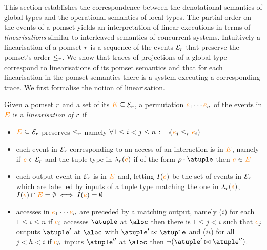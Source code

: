 This section establishes the correspondence between the denotational
semantics of global types and the operational semantics of local
types.
%
The partial order on the events of a pomset yields an interpretation
of linear executions in terms of \emph{linearisations} similar to
interleaved semantics of concurrent systems.
%
Intuitively a linearisation of a pomset $r$ is a sequence of the
events $\mathcal{E}_{r}$ that preserve the pomset's order
$\leq_{r}$.
%
We show that traces of projections of a global type correspond to
linearisations of its pomset semantics and that for each linearisation
in the pomset semantics there is a system executing a corresponding
trace.
%
We first formalise the notion of linearisation.

Given a pomset $r$ and a set of its ${\color{orange}{E}} \subseteq \mathcal{E}_{r}$,
a permutation ${\color{orange}{e}}_1 \cdots {\color{orange}{e}}_n$ of the events in ${\color{orange}{E}}$ is a
\emph{linearisation of $r$} if
\begin{itemize}
\item ${\color{orange}{E}} \subseteq \mathcal{E}_{r}$ preserves $\leq_{r}$ namely
  $\forall 1 \leq i < j \leq n \;\colon\; \neg ({\color{orange}{e}}_j \leq_{r} {\color{orange}{e}}_i)$
\item each event in $\mathcal{E}_{r}$ corresponding to an access of an
  interaction is in ${\color{orange}{E}}$, namely
  if ${\color{orange}{e}} \in \mathcal{E}_{r}$ and the tuple type in $\lambda_{r}({\color{orange}{e}})$
  if of the form $\arole \cdot \atuple$ then ${\color{orange}{e}} \in {\color{orange}{E}}$
\item each output event in $\mathcal{E}_{r}$ is in ${\color{orange}{E}}$ and, letting
  $I({\color{orange}{e}})$ be the set of events in $\mathcal{E}_{r}$ which are labelled
  by inputs of a tuple type matching the one in $\lambda_{r}({\color{orange}{e}})$,
  $I({\color{orange}{e}}) \cap {\color{orange}{E}} = \emptyset \iff I({\color{orange}{e}}) = \emptyset$
\item accesses in ${\color{orange}{e}}_1 \cdots {\color{orange}{e}}_n$ are preceded by a matching
  output, namely ($i$) for each $1 \leq i \leq n$ if ${\color{orange}{e}}_i$ accesses
  $\atuple$ at $\aloc$ then there is $1 \leq j < i$ such that ${\color{orange}{e}}_j$
  outputs $\atuple'$ at $\aloc$ with $\atuple' \matches \atuple$ and
  ($ii$) for all $j < h < i$ if ${\color{orange}{e}}_h$ inputs $\atuple''$ at $\aloc$
  then $\neg (\atuple' \matches \atuple'')$.
\end{itemize}


